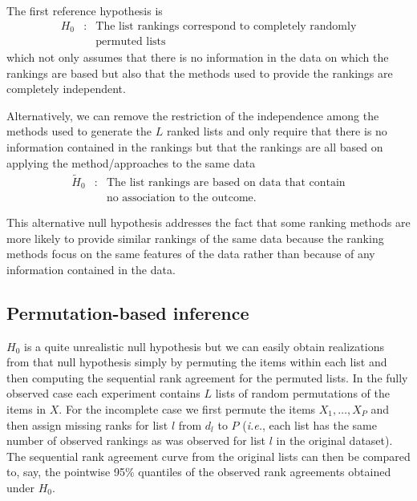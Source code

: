 \documentclass[oupdraft]{bio}
\makeatletter
\newcommand{\ie}{\emph{i.e.}\@\xspace}
\newcommand{\nn}{\nonumber}
\makeatother
\begin{document}
The first reference hypothesis is
\begin{eqnarray}
H_0  & : &  \text{The list rankings correspond to completely randomly}\label{eq:permutationHypothesis}\\
       &  & \text{permuted lists}\nn
\end{eqnarray}
which not only assumes that there is no information in the data on
which the rankings are based but also that the methods used to provide
the rankings are completely independent.

Alternatively, we can remove the restriction of the independence among
the methods used to generate the $L$ ranked lists and only require
that there is no information contained in the rankings but that the
rankings are all based on applying the method/approaches to the same
data
\begin{eqnarray*}
\widetilde H_0 & :&  \text{The list rankings are based on data that contain}\\
& &   \text{no association to the outcome.}
\end{eqnarray*}

This alternative null hypothesis addresses the fact that some ranking
methods are more likely to provide similar rankings of the same data
because the ranking methods focus on the same features of the data
rather than because of any information contained in the data.


\subsection{Permutation-based inference}

$H_0$ is a quite unrealistic null hypothesis but we can easily obtain
realizations from that null hypothesis simply by permuting the items
within each list and then computing the sequential rank agreement for
the permuted lists. In the fully observed case each experiment
contains $L$ lists of random permutations of the items in $X$. For the
incomplete case we first permute the items $X_1,\dots,X_P$ and then assign missing ranks
for list $l$ from  $d_l$ to $P$ (\ie, each list has the same number of
observed rankings as was observed for list $l$ in the original
dataset). The sequential rank agreement curve from the original
lists can then be compared to, say, the pointwise 95\% quantiles of
the observed rank agreements obtained under $H_0$.
\end{document}
